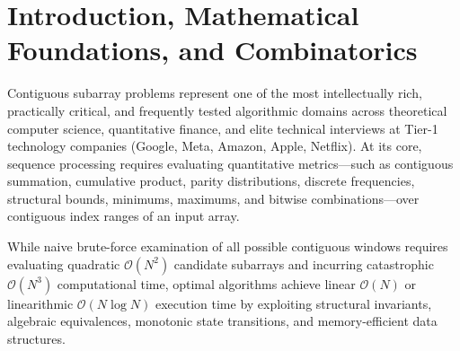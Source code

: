 \documentclass[10pt,journal,compsoc,onecolumn]{IEEEtran}
\begin{document}
\maketitle
\IEEEdisplaynontitleabstractindextext
\IEEEpeerreviewmaketitle

\section{Introduction, Mathematical Foundations, and Combinatorics}
\label{sec:intro}

Contiguous subarray problems represent one of the most intellectually rich, practically critical, and frequently tested algorithmic domains across theoretical computer science, quantitative finance, and elite technical interviews at Tier-1 technology companies (Google, Meta, Amazon, Apple, Netflix). At its core, sequence processing requires evaluating quantitative metrics---such as contiguous summation, cumulative product, parity distributions, discrete frequencies, structural bounds, minimums, maximums, and bitwise combinations---over contiguous index ranges of an input array.

While naive brute-force examination of all possible contiguous windows requires evaluating quadratic $\mathcal{O}(N^2)$ candidate subarrays and incurring catastrophic $\mathcal{O}(N^3)$ computational time, optimal algorithms achieve linear $\mathcal{O}(N)$ or linearithmic $\mathcal{O}(N \log N)$ execution time by exploiting structural invariants, algebraic equivalences, monotonic state transitions, and memory-efficient data structures.
\end{document}
